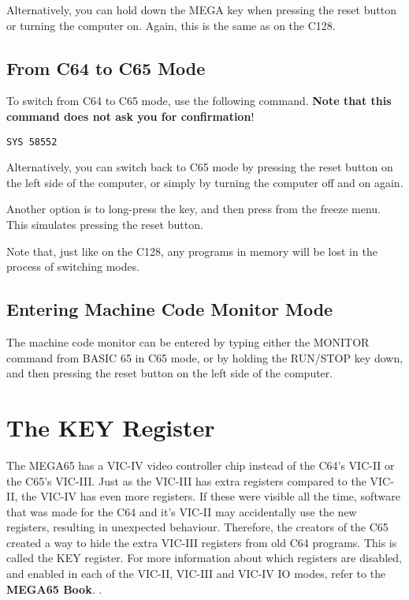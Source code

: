 Alternatively, you can hold down the MEGA key when pressing the reset button or turning the computer on. Again,
this is the same as on the C128.

\subsection{From C64 to C65 Mode}

To switch from C64 to C65 mode, use the following command. {\bf Note that this command does not ask you for
confirmation}!

\begin{tcolorbox}[colback=black,coltext=white]
\verbatimfont{\codefont}
\begin{verbatim}
SYS 58552
\end{verbatim}
\end{tcolorbox}

Alternatively, you can switch back to C65 mode by pressing the reset
button on the left side of the computer, or simply by turning the
computer off and on again.

Another option is to long-press the  key, and then press 
from the freeze menu.  This simulates pressing the reset button.

Note that, just like on the C128, any programs in memory will be
lost in the process of switching modes.

\subsection{Entering Machine Code Monitor Mode}

The machine code monitor can be entered by typing either the MONITOR
command from BASIC 65 in C65 mode, or by holding the RUN/STOP key
down, and then pressing the reset button on the left side of the
computer.

\section{The KEY Register}

The MEGA65 has a VIC-IV video controller chip instead of the C64's VIC-II or
the C65's VIC-III.  Just as the VIC-III has extra registers compared to the
VIC-II, the VIC-IV has even more registers.  If these were visible all the time,
software that was made for the C64 and it's VIC-II may accidentally use the
new registers, resulting in unexpected behaviour.  Therefore, the
creators of the C65 created a way to hide the extra VIC-III registers from old
C64 programs. This is called the KEY register. For more information
about which registers are disabled, and enabled in each of the
VIC-II, VIC-III and VIC-IV IO modes, refer to
\ifdefined\printmanual
 the {\bf MEGA65 Book}.
\else
 .
\fi

